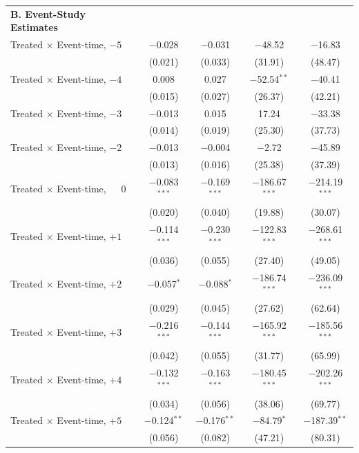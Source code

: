\begin{table}[htbp]
{\begin{tabular}{@{\extracolsep{6pt}}p{6.5cm}cccc}
\textbf{B. Event-Study Estimates} \\[0.15em]
Treated $\times$ Event-time, $-5$ & $-$0.028 & $-$0.031 & $-$48.52 & $-$16.83 \\
                                 & (0.021)  & (0.033)  & (31.91)  & (48.47)  \\[0.15em]
Treated $\times$ Event-time, $-4$ & 0.008    & 0.027    & $-$52.54$^{**}$ & $-$40.41 \\
                                 & (0.015)  & (0.027)  & (26.37)  & (42.21)  \\[0.15em]
Treated $\times$ Event-time, $-3$ & $-$0.013 & 0.015    & 17.24    & $-$33.38 \\
                                 & (0.014)  & (0.019)  & (25.30)  & (37.73)  \\[0.15em]
Treated $\times$ Event-time, $-2$ & $-$0.013 & $-$0.004 & $-$2.72  & $-$45.89 \\
                                 & (0.013)  & (0.016)  & (25.38)  & (37.39)  \\[0.15em]
Treated $\times$ Event-time, $\phantom{-} 0$  & $-$0.083$^{***}$ & $-$0.169$^{***}$ & $-$186.67$^{***}$ & $-$214.19$^{***}$ \\
                                 & (0.020)         & (0.040)         & (19.88)         & (30.07) \\[0.15em]
Treated $\times$ Event-time, $+1$ & $-$0.114$^{***}$ & $-$0.230$^{***}$ & $-$122.83$^{***}$ & $-$268.61$^{***}$ \\
                                 & (0.036)         & (0.055)         & (27.40)         & (49.05) \\[0.15em]
Treated $\times$ Event-time, $+2$ & $-$0.057$^{*}$   & $-$0.088$^{*}$   & $-$186.74$^{***}$ & $-$236.09$^{***}$ \\
                                 & (0.029)         & (0.045)         & (27.62)         & (62.64) \\[0.15em]
Treated $\times$ Event-time, $+3$ & $-$0.216$^{***}$ & $-$0.144$^{***}$ & $-$165.92$^{***}$ & $-$185.56$^{***}$ \\
                                 & (0.042)         & (0.055)         & (31.77)         & (65.99) \\[0.15em]
Treated $\times$ Event-time, $+4$ & $-$0.132$^{***}$ & $-$0.163$^{***}$ & $-$180.45$^{***}$ & $-$202.26$^{***}$ \\
                                 & (0.034)         & (0.056)         & (38.06)         & (69.77) \\[0.15em]
Treated $\times$ Event-time, $+5$ & $-$0.124$^{**}$  & $-$0.176$^{**}$  & $-$84.79$^{*}$    & $-$187.39$^{**}$  \\
                                 & (0.056)         & (0.082)         & (47.21)         & (80.31) \\[0.35em]



\end{tabular}}
\end{table}
